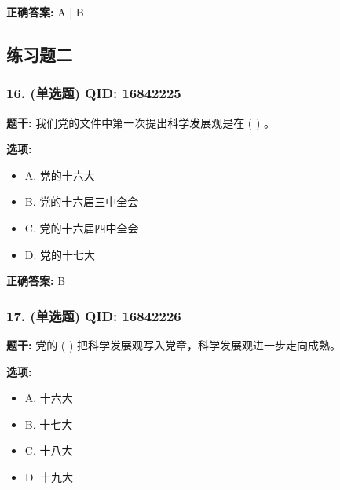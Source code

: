 \documentclass[12pt,UTF8]{ctexart}
\begin{document}
\textbf{正确答案:}
A | B

\vspace{0.3em}\hrulefill\vspace{0.7em}

\subsection*{练习题二}

\subsubsection*{16. (单选题) \small QID: 16842225}

\textbf{题干:}
我们党的文件中第一次提出科学发展观是在 ( ) 。

\textbf{选项:}
\begin{itemize}[leftmargin=*]

  \item A. 党的十六大

  \item B. 党的十六届三中全会

  \item C. 党的十六届四中全会

  \item D. 党的十七大

\end{itemize}

\textbf{正确答案:}
B

\vspace{0.3em}\hrulefill\vspace{0.7em}

\subsubsection*{17. (单选题) \small QID: 16842226}

\textbf{题干:}
党的 ( ) 把科学发展观写入党章，科学发展观进一步走向成熟。

\textbf{选项:}
\begin{itemize}[leftmargin=*]

  \item A. 十六大

  \item B. 十七大

  \item C. 十八大

  \item D. 十九大

\end{itemize}
\end{document}
